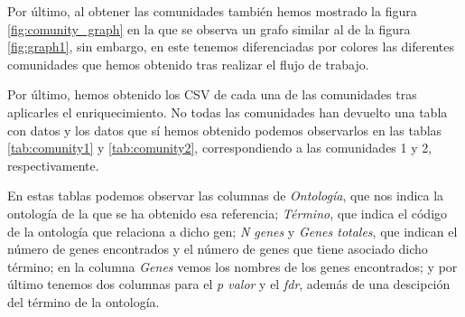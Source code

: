 \begin{spacing}{1}
	Por último, al obtener las comunidades también hemos mostrado la figura \ref{fig:comunity_graph} en la que se observa un grafo similar al de la figura \ref{fig:graph1}, sin embargo, en este tenemos diferenciadas por colores las diferentes comunidades que hemos obtenido tras realizar el flujo de trabajo.
\end{spacing}

\begin{minipage}{\linewidth}
	\label{fig:comunity_graph}
\end{minipage}

\begin{spacing}{1}
Por último, hemos obtenido los CSV de cada una de las comunidades tras aplicarles el enriquecimiento. No todas las comunidades han devuelto una tabla con datos y los datos que sí hemos obtenido podemos observarlos en las tablas \ref{tab:comunity1} y \ref{tab:comunity2}, correspondiendo a las comunidades 1 y 2, respectivamente.

En estas tablas podemos observar las columnas de \textit{Ontología}, que nos indica la ontología de la que se ha obtenido esa referencia; \textit{Término}, que indica el código de la ontología que relaciona a dicho gen; \textit{N genes} y \textit{Genes totales}, que indican el número de genes encontrados y el número de genes que tiene asociado dicho término; en la columna \textit{Genes} vemos los nombres de los genes encontrados; y por último tenemos dos columnas para el \textit{p valor} y el \textit{fdr}, además de una descipción del término de la ontología.
\end{spacing}

